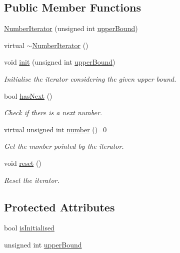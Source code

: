 \subsection*{Public Member Functions}
\begin{DoxyCompactItemize}
\item 
\hyperlink{classmultiscale_1_1NumberIterator_adc85caa104c89062cb7c3072b65da827}{Number\-Iterator} (unsigned int \hyperlink{classmultiscale_1_1NumberIterator_a56a5558958778bbde64e249d67cba886}{upper\-Bound})
\item 
virtual \hyperlink{classmultiscale_1_1NumberIterator_aae2ce809339ed853f49619ad69596229}{$\sim$\-Number\-Iterator} ()
\item 
void \hyperlink{classmultiscale_1_1NumberIterator_a7bec93b2150c52b022de484c49b551e0}{init} (unsigned int \hyperlink{classmultiscale_1_1NumberIterator_a56a5558958778bbde64e249d67cba886}{upper\-Bound})
\begin{DoxyCompactList}\small\item\em Initialise the iterator considering the given upper bound. \end{DoxyCompactList}\item 
bool \hyperlink{classmultiscale_1_1NumberIterator_a9169e7244347d2dbd657ad4f36b55f5b}{has\-Next} ()
\begin{DoxyCompactList}\small\item\em Check if there is a next number. \end{DoxyCompactList}\item 
virtual unsigned int \hyperlink{classmultiscale_1_1NumberIterator_a967fc14523f8726d5d6352d4ed6439ca}{number} ()=0
\begin{DoxyCompactList}\small\item\em Get the number pointed by the iterator. \end{DoxyCompactList}\item 
void \hyperlink{classmultiscale_1_1NumberIterator_a9e22075eb67dd5ebf4b03a4a67734a36}{reset} ()
\begin{DoxyCompactList}\small\item\em Reset the iterator. \end{DoxyCompactList}\end{DoxyCompactItemize}
\subsection*{Protected Attributes}
\begin{DoxyCompactItemize}
\item 
bool \hyperlink{classmultiscale_1_1NumberIterator_ae3d929444e14677de0b616a059380f3f}{is\-Initialised}
\item 
unsigned int \hyperlink{classmultiscale_1_1NumberIterator_a56a5558958778bbde64e249d67cba886}{upper\-Bound}
\end{DoxyCompactItemize}
